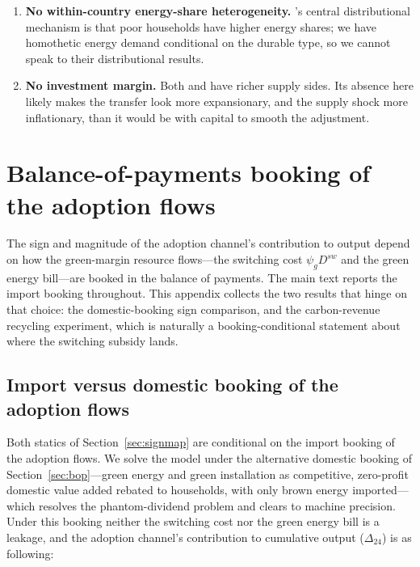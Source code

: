 \documentclass[11pt,a4paper]{article}
\begin{document}
\begin{enumerate}
\item \textbf{No within-country energy-share heterogeneity.}
\citet{Bayer2026}'s central distributional mechanism is that poor households
have higher energy shares; we have homothetic energy demand conditional on
the durable type, so we cannot speak to their distributional results.

\item \textbf{No investment margin.} Both \citet{Bayer2026} and
\citet{ARS2024} have richer supply sides. Its absence here likely makes the
transfer look more expansionary, and the supply shock more inflationary, than
it would be with capital to smooth the adjustment.

\end{enumerate}

\appendix

\section{Balance-of-payments booking of the adoption flows}
\label{app:booking}

The sign and magnitude of the adoption channel's contribution to output depend
on how the green-margin resource flows---the switching cost $\psi_g D^{sw}$ and
the green energy bill---are booked in the balance of payments. The main text
reports the import booking throughout. This appendix collects the two results
that hinge on that choice: the domestic-booking sign comparison, and the
carbon-revenue recycling experiment, which is naturally a booking-conditional
statement about where the switching subsidy lands.

\subsection{Import versus domestic booking of the adoption flows}\label{app:booking_flows}
Both statics of Section~\ref{sec:signmap} are conditional on the import booking of the
adoption flows. We solve the model under the alternative domestic booking of
Section~\ref{sec:bop}---green energy and green installation as competitive,
zero-profit domestic value added rebated to households, with only brown energy
imported---which resolves the phantom-dividend problem and clears to machine
precision. Under this booking neither the switching cost nor the green energy
bill is a leakage, and the adoption channel's contribution to cumulative output
($\Delta_{24}$) is as following:
\end{document}
